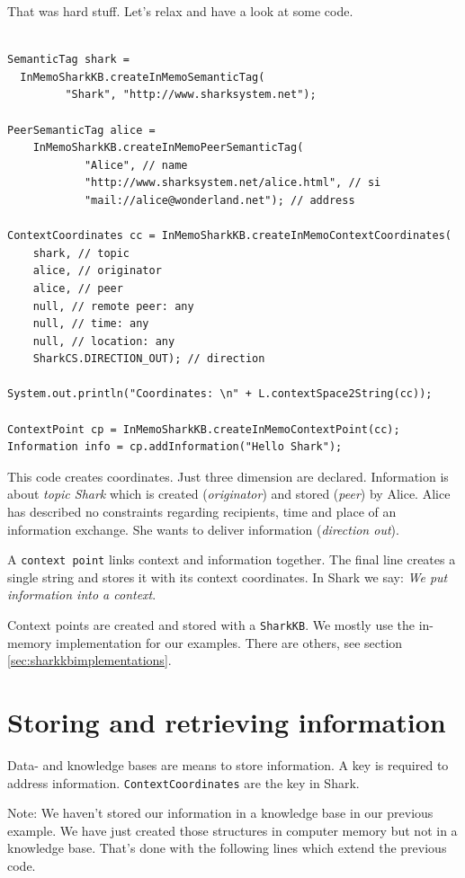 That was hard stuff. Let's relax and have a look at some code. 

\begin{verbatim}

SemanticTag shark = 
  InMemoSharkKB.createInMemoSemanticTag(
         "Shark", "http://www.sharksystem.net");

PeerSemanticTag alice =  
    InMemoSharkKB.createInMemoPeerSemanticTag(
            "Alice", // name
            "http://www.sharksystem.net/alice.html", // si
            "mail://alice@wonderland.net"); // address

ContextCoordinates cc = InMemoSharkKB.createInMemoContextCoordinates(
    shark, // topic
    alice, // originator
    alice, // peer
    null, // remote peer: any
    null, // time: any
    null, // location: any
    SharkCS.DIRECTION_OUT); // direction

System.out.println("Coordinates: \n" + L.contextSpace2String(cc));

ContextPoint cp = InMemoSharkKB.createInMemoContextPoint(cc);
Information info = cp.addInformation("Hello Shark");
\end{verbatim}

This code creates coordinates. Just three dimension are declared. Information is about {\it topic Shark} which is created ({\it originator}) and stored ({\it peer}) by Alice. Alice has described no constraints regarding recipients, time and place of an information exchange. She wants to deliver information ({\it direction out}).

A {\tt context point} links context and information together. The final line creates a single string and stores it with its context coordinates. In Shark we say: {\it We put information into a context}.

Context points are created and stored with a {\tt SharkKB}. We mostly use the in-memory implementation for our examples. There are others, see section \ref{sec:sharkkbimplementations}.

\section{Storing and retrieving information}
Data- and knowledge bases are means to store information. A key is required to address information. {\tt ContextCoordinates} are the key in Shark.

Note: We haven't stored our information in a knowledge base in our previous example. We have just created those structures in computer memory but not in a knowledge base. That's done with the following lines which extend the previous code.

